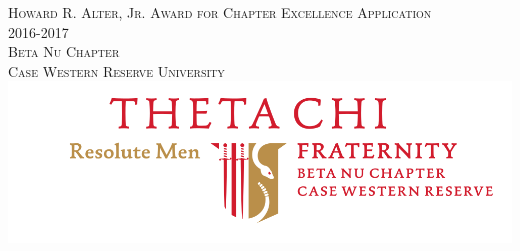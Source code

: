 \documentclass[oneside,openany]{book}
\begin{document}
  \begin{titlepage}
    \begin{center}
      \textsc{\Huge Howard R. Alter, Jr. Award for Chapter Excellence Application } \\[0.5cm]
      \textsc{\Huge 2016-2017} \\[1.0cm]
      \textsc{\Large Beta Nu Chapter} \\[0.3cm]
      \textsc{\Large Case Western Reserve University} \\[1.5cm]
      \includegraphics[scale=0.50]{betanulogo.png}
    \end{center}
  \end{titlepage}

  \tableofcontents

  \frontmatter
    

  \mainmatter
    
    
    
    
    
    
    
    
    
    
    
    
    
    
\end{document}
